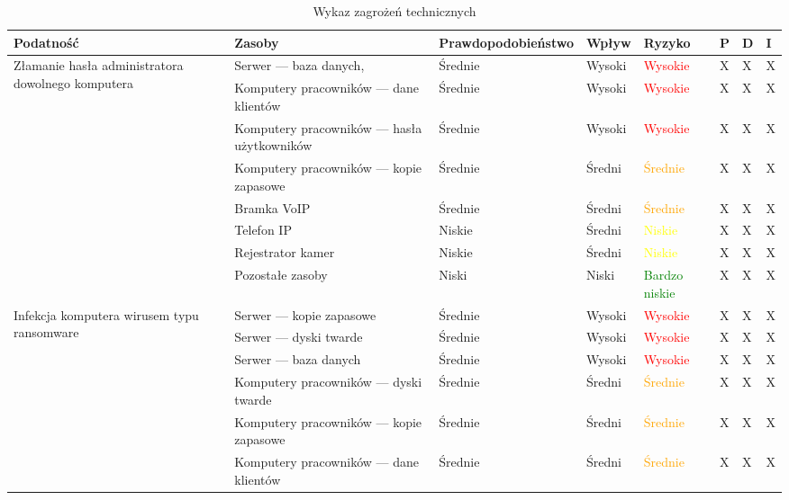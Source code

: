 \begin{landscape}
	\begin{longtable}[ht!]{|m{3cm}|m{6cm}|m{4.5cm}|m{3cm}|m{3cm}|m{0.5cm}|m{0.5cm}|m{0.5cm}|}
		\caption{Wykaz zagrożeń technicznych}
		\label{tab:zagrozenia_techniczne}\\
		\hline	
		\textbf{Podatność} & \textbf{Zasoby} & \textbf{Prawdopodobieństwo} & \textbf{Wpływ} &  \textbf{Ryzyko} & \textbf{P} & \textbf{D} & \textbf{I} \\ \hline
		\multirow{5}{4cm}{Złamanie hasła administratora dowolnego komputera}  
		&   Serwer --- baza danych,  & Średnie & Wysoki & \textcolor{red}{Wysokie} & X & X & X  \\ \cline{2-8}
		& Komputery pracowników --- dane klientów & Średnie & Wysoki & \textcolor{red}{Wysokie}  & X & X & X  \\ \cline{2-8}
		& Komputery pracowników --- hasła użytkowników  & Średnie & Wysoki & \textcolor{red}{Wysokie}  & X & X & X  \\ \cline{2-8}
		& Komputery pracowników --- kopie zapasowe & Średnie & Średni & \textcolor{orange}{Średnie}  & X & X & X  \\ \cline{2-8}
		& Bramka VoIP & Średnie & Średni & \textcolor{orange}{Średnie}  & X & X & X  \\ \cline{2-8}
		& Telefon IP & Niskie & Średni & \textcolor{yellow}{Niskie}  & X & X & X  \\ \cline{2-8}
		& Rejestrator kamer  & Niskie & Średni & \textcolor{yellow}{Niskie}  & X & X & X  \\ \cline{2-8}
		& Pozostałe zasoby  & Niski & Niski & \textcolor{green}{Bardzo niskie} & X & X & X  \\ \cline{2-8}
		\hline
		\multirow{8}{4cm}{Infekcja komputera wirusem typu ransomware}
		& Serwer --- kopie zapasowe & Średnie & Wysoki & \textcolor{red}{Wysokie}& X & X & X  \\ \cline{2-8} \cline{2-5}
		& Serwer --- dyski twarde & Średnie & Wysoki & \textcolor{red}{Wysokie} & X & X & X  \\ \cline{2-8}
		& Serwer --- baza danych & Średnie & Wysoki & \textcolor{red}{Wysokie} & X & X & X  \\ \cline{2-8}
		& Komputery pracowników --- dyski twarde & Średnie & Średni & \textcolor{orange}{Średnie} & X & X & X  \\ \cline{2-8}
		& Komputery pracowników --- kopie zapasowe & Średnie & Średni & \textcolor{orange}{Średnie} & X & X & X  \\ \cline{2-8}
		& Komputery pracowników --- dane klientów & Średnie & Średni & \textcolor{orange}{Średnie} & X & X & X  \\ \cline{2-8}

\end{longtable}
\end{landscape}
